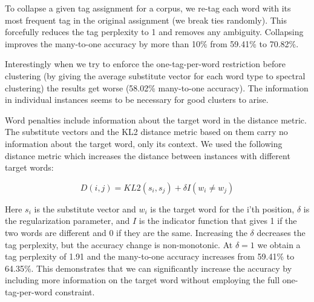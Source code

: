 \documentclass[11pt]{article}
\newcommand{\spectralResult}{59.41}
\newcommand{\collapseResult}{70.82}
\begin{document}
To collapse a given tag assignment for a corpus, we re-tag each word
with its most frequent tag in the original assignment (we break ties
randomly).  This forcefully reduces the tag perplexity to 1 and
removes any ambiguity.  Collapsing improves the many-to-one accuracy
by more than 10\% from \spectralResult\% to \collapseResult\%.

Interestingly when we try to enforce the one-tag-per-word restriction
before clustering (by giving the average substitute vector for each
word type to spectral clustering) the results get worse (58.02\%
many-to-one accuracy).  The information in individual instances seems
to be necessary for good clusters to arise.

Word penalties include information about the target word in the
distance metric.  The substitute vectors and the KL2 distance metric
based on them carry no information about the target word, only its
context.  We used the following distance metric which increases the
distance between instances with different target words:

\[ D(i, j) = KL2(s_i,s_j)+\delta I(w_i \neq w_j) \]

Here $s_i$ is the substitute vector and $w_i$ is the target word for
the i'th position, $\delta$ is the regularization parameter, and $I$
is the indicator function that gives 1 if the two words are different
and 0 if they are the same.  Increasing the $\delta$ decreases the tag
perplexity, but the accuracy change is non-monotonic.  At $\delta=1$
we obtain a tag perplexity of 1.91 and the many-to-one accuracy
increases from \spectralResult\% to 64.35\%.  This demonstrates that
we can significantly increase the accuracy by including more
information on the target word without employing the full
one-tag-per-word constraint.  


\end{document}
